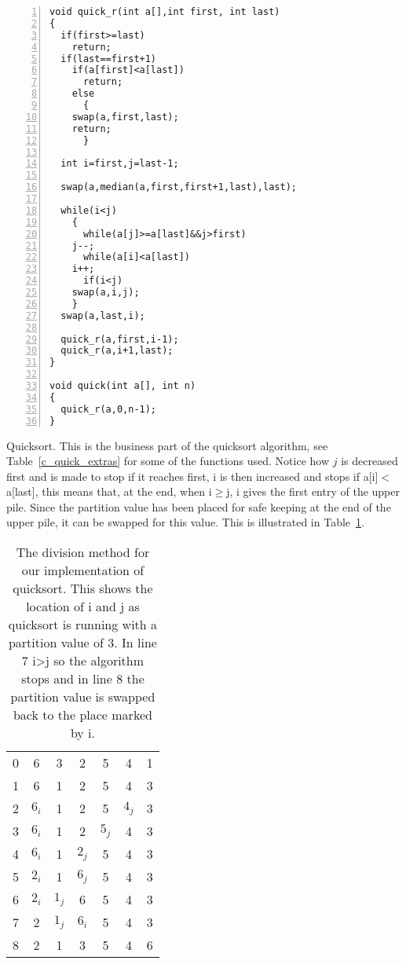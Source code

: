 \documentclass[11pt,a4paper]{scrartcl}
\begin{document}
\begin{table}
\begin{lstlisting}[numbers=left]
void quick_r(int a[],int first, int last)
{
  if(first>=last)
    return;
  if(last==first+1)
    if(a[first]<a[last])
      return;
    else
      {
	swap(a,first,last);
	return;
      }

  int i=first,j=last-1;

  swap(a,median(a,first,first+1,last),last);
  
  while(i<j)
    {
      while(a[j]>=a[last]&&j>first)
	j--;
      while(a[i]<a[last])
	i++;
      if(i<j)
	swap(a,i,j);
    }
  swap(a,last,i);

  quick_r(a,first,i-1);
  quick_r(a,i+1,last);
}

void quick(int a[], int n)
{
  quick_r(a,0,n-1);
}
\end{lstlisting}
\caption{Quicksort. This is the business part of the quicksort
  algorithm, see Table~\ref{c_quick_extras} for some of the functions
  used. Notice how $j$ is decreased first and is made to stop if it
  reaches first, i is then increased and stops if a[i]$<$a[last], this
  means that, at the end, when i$\ge$j, i gives the first entry of the
  upper pile. Since the partition value has been placed for safe
  keeping at the end of the upper pile, it can be swapped for this
  value. This is illustrated in
  Table~\ref{table_quick_careful}.\label{c_quick}}
\end{table}



\begin{table}
\begin{tabular}{c|cccccc}
0&6&3&2&5&4&1\\
1&6&1&2&5&4&3\\
2&$6_i$&1&2&5&$4_j$&3\\
3&$6_i$&1&2&$5_j$&4&3\\
4&$6_i$&1&$2_j$&5&4&3\\
5&$2_i$&1&$6_j$&5&4&3\\
6&$2_i$&$1_j$&6&5&4&3\\
7&2&$1_j$&$6_i$&5&4&3\\
8&2&1&3&5&4&6
\end{tabular}
\caption{The division method for our implementation of quicksort. This
  shows the location of i and j as quicksort is running with a partition value of 3. In line 7 i>j
  so the algorithm stops and in line 8 the partition value is swapped
  back to the place marked by i.\label{table_quick_careful}}
\end{table}
\end{document}
